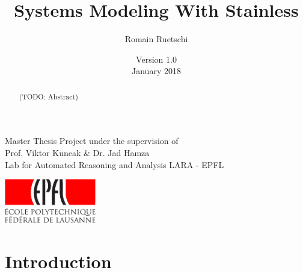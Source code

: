 \documentclass[a4paper,twoside]{article}
\title{Systems Modeling With Stainless}
\date{
  {\small Version 1.0}\\
  January 2018
}
\author{Romain Ruetschi}
\makeatletter
\newcommand*{\flipmargins}{%
  \clearpage
  \setlength{\@tempdima}{\oddsidemargin}%
  \setlength{\oddsidemargin}{\evensidemargin}%
  \setlength{\evensidemargin}{\@tempdima}%
  \if@reversemargin
    \normalmarginpar
  \else
    \reversemarginpar
  \fi
}
\newcommand{\TODO}[1]{\textcolor{YellowOrange}{(TODO: #1)}} %
\makeatother
\begin{document}
\maketitle

\vfill

\begin{abstract}

\TODO{Abstract}

\end{abstract}

\vfill

\begin{center}
    Master Thesis Project under the supervision of \\
    Prof. Viktor Kuncak \& Dr. Jad Hamza \\
    Lab for Automated Reasoning and Analysis LARA - EPFL
\end{center}

\begin{center}
    \includegraphics[width = 40mm]{res/epfl-logo}
\end{center}

\clearpage\null\newpage

\restoregeometry              %
\flipmargins
\pagestyle{mystyle_no_header}

\tableofcontents

\clearpage
\pagestyle{mystyle}


\section{Introduction}
\end{document}
